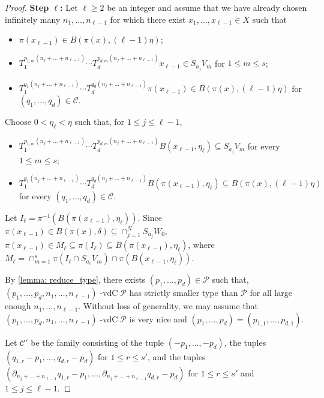 \documentclass[11pt,reqno]{amsart}
\newcommand{\cC}{{\mathcal C}}
\newcommand{\cP}{{\mathcal P}}
\DeclareMathOperator{\vdc}{-vdC}
\theoremstyle{definition}
\theoremstyle{remark}
\begin{document}
\begin{proof}
\textbf{Step $\ell$:} Let $\ell\geq 2$ be an integer and assume that we have already chosen infinitely many $n_1,\dots,n_{\ell-1}$ for which there exist $x_1,\dots,x_{\ell-1}\in X$ such that\begin{itemize}
    \item $\pi(x_{\ell-1})\in B(\pi(x),(\ell-1)\eta)$;
    \item $T_1^{p_{1,m}(n_{j}+\dots+n_{\ell-1})}\cdots T_d^{p_{d,m}(n_{j}+\dots+n_{\ell-1})}x_{\ell-1}\in S_{a_{j}}V_{m}$ for $1\leq m\leq s$;
    \item $T_1^{q_1(n_{j}+\dots+n_{\ell-1})}\cdots T_d^{q_d(n_{j}+\dots+n_{\ell-1})} \pi(x_{\ell-1})\in B(\pi(x),(\ell-1)\eta)$ for $(q_1,\dots,q_d)\in \cC$.
\end{itemize}

Choose $0<\eta_{\ell}<\eta$ such that, for $1\leq j \leq \ell-1$,\begin{itemize}
    \item $T_1^{p_{1,m}(n_{j}+\dots+n_{\ell-1})}\cdots T_d^{p_{d,m}(n_{j}+\dots+n_{\ell-1})}B(x_{\ell-1},\eta_{\ell})\subseteq S_{a_{j}} V_{m}$ for every $1\leq m\leq s$;
    \item $T_1^{q_1(n_{j}+\dots+n_{\ell-1})}\cdots T_d^{q_d(n_{j}+\dots+n_{\ell-1})}B(\pi(x_{\ell-1}),\eta_{\ell}) \subseteq B(\pi(x),(\ell-1)\eta)$ for every $(q_1,\dots,q_d)\in \cC$.
\end{itemize}

Let $I_{\ell} = \pi^{-1}(B(\pi(x_{\ell-1}),\eta_{\ell}))$. Since $\pi(x_{\ell-1})\in B(\pi(x),\delta)\subseteq \cap_{j=1}^{N} S_{a_j}W_0$, $\pi(x_{\ell-1})\in M_{\ell} \subseteq \pi(I_{\ell})\subseteq B(\pi(x_{\ell-1}),\eta_\ell)$, where $M_{\ell} = \cap_{m=1}^{s}\pi(I_{\ell}\cap S_{a_{\ell}}V_{m}) \cap \pi(B(x_{\ell-1},\eta_\ell))$.

By \cref{lemma: reduce_type}, there exists $(p_1,\dots,p_d)\in \cP$ such that,  $(p_1,\dots,p_d,n_1,\dots,n_{\ell-1})\vdc \cP$ has strictly smaller type than $\cP$ for all large enough $n_1,\dots,n_{\ell-1}$. Without loss of generality, we may assume that $(p_1,\dots,p_d,n_1,\dots,n_{\ell-1})\vdc \cP$ is very nice and $(p_1,\dots,p_d)=(p_{1,1},\dots,p_{d,1})$.

Let $\cC'$ be the family consisting of the tuple $(-p_1,\dots,-p_d)$, the tuples $(q_{1,r}-p_1,\dots,q_{d,r}-p_d)$ for $1\leq r \leq s'$, and the tuples $(\partial_{n_j+\dots+n_{\ell-1}}q_{1,r}-p_1,\dots,\partial_{n_j+\dots+n_{\ell-1}}q_{d,r}-p_d)$ for $1\leq r \leq s'$ and $1\leq j\leq \ell-1$.


\end{proof}
\end{document}
